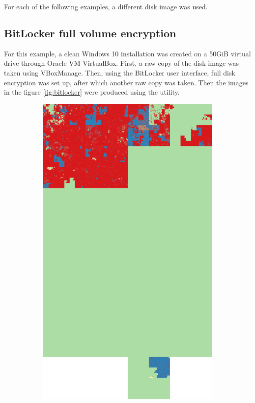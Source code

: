 \documentclass[
  digital, %
  color,   %
  oneside, %
  lof,     %
  nolot,     %
]{fithesis4}
\begin{document}
For each of the following examples, a different disk image was used.

\subsection{BitLocker full volume encryption}
\label{ssec:bitlocker-full-volume-encryption}

For this example, a clean Windows 10 installation was created on a 50GiB virtual drive through Oracle VM VirtualBox.
First, a raw copy of the disk image was taken using VBoxManage.
Then, using the BitLocker user interface, full disk encryption was set up, after which another raw copy was taken.
Then the images in the figure \ref{fig:bitlocker} were produced using the utility.

\begin{figure}
  \centering
  \begin{subfigure}[t]{.45\textwidth}
    \centering
    \includegraphics[width=\textwidth,interpolate=false]{win-unencrypted-chi2-4-hilbert.png}

\end{subfigure}
\end{figure}
\end{document}
